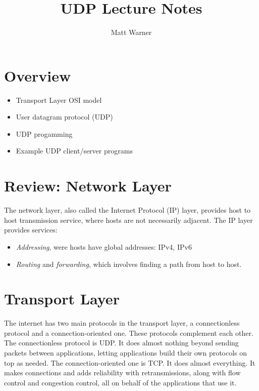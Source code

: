 \documentclass{report}
\title{\Huge{UDP Lecture Notes}}
\author{\huge{Matt Warner}}
\date{\huge{}}
\begin{document}
  \maketitle
\section{Overview}
\begin{itemize}
  \item Transport Layer OSI model
  \item User datagram protocol (UDP)
  \item UDP progamming
  \item Example UDP client/server programs
\end{itemize}
\section{Review: Network Layer}
The network layer, also called the Internet Protocol (IP) layer, provides host to host transmission service, where hosts are not necessarily adjacent.
\bigbreak \noindent
The IP layer provides services:
\begin{itemize}
  \item \textit{Addressing}, were hosts have global addresses: IPv4, IPv6
  \item \textit{Routing} and \textit{forwarding}, which involves finding a path from host to host.
\end{itemize}
\section{Transport Layer}
The internet has two main protocols in the transport layer, a connectionless protocol and a connection-oriented one. These protocols complement each other.
\bigbreak \noindent
The connectionless protocol is UDP. It does almost nothing beyond sending packets between applications, letting applications build their own protocols on top as needed.
\bigbreak \noindent
The connection-oriented one is TCP. It does almost everything. It makes connections and adds reliability with retransmissions, along with flow control and congestion control, all on behalf of the applications that use it.
\end{document}
